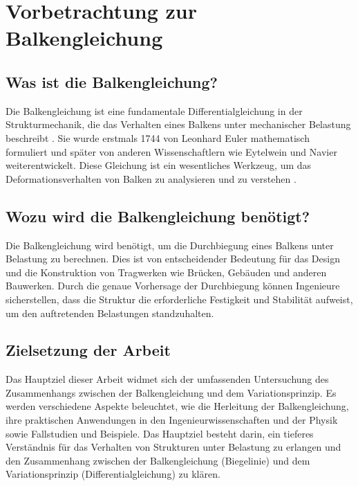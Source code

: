 %
%
%
%
\section{Vorbetrachtung zur Balkengleichung\label{balken:section:teil0}}
\subsection{Was ist die Balkengleichung?}
Die Balkengleichung ist eine fundamentale Differentialgleichung in der Strukturmechanik, die das Verhalten eines Balkens unter mechanischer Belastung beschreibt \cite{balken:Balkentheorie}.
Sie wurde erstmals 1744 von Leonhard Euler mathematisch formuliert und später von anderen Wissenschaftlern wie Eytelwein und Navier weiterentwickelt. 
Diese Gleichung ist ein wesentliches Werkzeug, um das Deformationsverhalten von Balken zu analysieren und zu verstehen \cite{balken:Biegelinie}.

\subsection{Wozu wird die Balkengleichung benötigt?}
Die Balkengleichung wird benötigt, um die Durchbiegung eines Balkens unter Belastung zu berechnen.
Dies ist von entscheidender Bedeutung für das Design und die Konstruktion von Tragwerken wie Brücken, Gebäuden und anderen Bauwerken. 
Durch die genaue Vorhersage der Durchbiegung können Ingenieure sicherstellen, dass die Struktur die erforderliche Festigkeit und Stabilität aufweist, um den auftretenden Belastungen standzuhalten.

\subsection{Zielsetzung der Arbeit}
Das Hauptziel dieser Arbeit widmet sich der umfassenden Untersuchung des Zusammenhangs zwischen der Balkengleichung und dem Variationsprinzip. 
Es werden verschiedene Aspekte beleuchtet, wie die Herleitung der Balkengleichung, ihre praktischen Anwendungen in den Ingenieurwissenschaften und der Physik sowie Fallstudien und Beispiele. 
Das Hauptziel besteht darin, ein tieferes Verständnis für das Verhalten von Strukturen unter Belastung zu erlangen und den Zusammenhang zwischen der Balkengleichung (Biegelinie) und dem Variationsprinzip (Differentialgleichung) zu klären.


